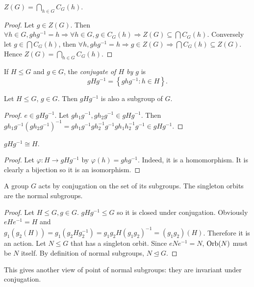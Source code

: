 \documentclass[10pt]{article}
\def\le{\leqslant}
\def\ltrigeq{\trianglelefteq}
\begin{document}
      \begin{proposition}
          $\displaystyle Z(G)=\bigcap_{h\in G}C_G(h)$. 
      \end{proposition}
      \begin{proof}
          Let $g\in Z(G)$. Then $\forall h\in G, ghg^{-1}=h \Rightarrow \forall h\in G, g\in C_G(h) \Rightarrow Z(G)\subseteq \bigcap C_G(h)$. Conversely let $ g\in \bigcap C_G(h) $, then $ \forall h, ghg^{-1}=h \Rightarrow g\in Z(G) \Rightarrow \bigcap C_G(h) \subseteq Z(G) $. Hence $ Z(G)=\bigcap_{h\in G}C_G(h) $.
      \end{proof}
      \begin{definition}
          If $H\le G$ and $g\in G$, the \textit{conjugate of $H$ by $g$} is 
          \[
              gHg^{-1}=\left\{ ghg^{-1}:h\in H \right\}
          .\]
      \end{definition}
      \begin{proposition}\label{prop:5.21}
          Let $H\le G$, $g\in G$. Then $gHg^{-1}$ is also a subgroup of $G$.
      \end{proposition}
      \begin{proof}
          $e\in gHg^{-1}$. Let $gh_1g^{-1},gh_2g^{-1}\in gHg^{-1}$. Then $ gh_1g^{-1}(gh_2g^{-1})^{-1}=gh_1g^{-1}gh_2^{-1}g^{-1}gh_1h_2^{-1}g^{-1}\in gHg^{-1} $.
      \end{proof}
      \begin{proposition}
          $ gHg^{-1} \cong H $.
      \end{proposition}
      \begin{proof}
          Let $ \varphi: H \to gHg^{-1} $ by $ \varphi(h)=ghg^{-1} $. Indeed, it is a homomorphism. It is clearly a bijection so it is an isomorphism.
      \end{proof}
      \begin{proposition}\label{prop:5.22}
          A group $G$ acts by conjugation on the set of its subgroups. The singleton orbits are the normal subgroups.
      \end{proposition}
      \begin{proof}
          Let $H\le G, g\in G$. $ gHg^{-1}\le G $ so it is closed under conjugation. Obviously $ eHe^{-1}=H $ and $ g_1(g_2(H))=g_1(g_2Hg_2^{-1})=g_1g_2H(g_1g_2)^{-1}=(g_1g_2)(H) $. Therefore it is an action. Let $N \le G$ that has a singleton orbit. Since $eNe^{-1}=N$, $ \operatorname{Orb}(N) $ must be $N$ itself. By definition of normal subgroups, $ N \ltrigeq G $.
      \end{proof}
      \begin{remark}
        This gives another view of point of normal subgroups: they are invariant under conjugation.
      \end{remark}
\end{document}

